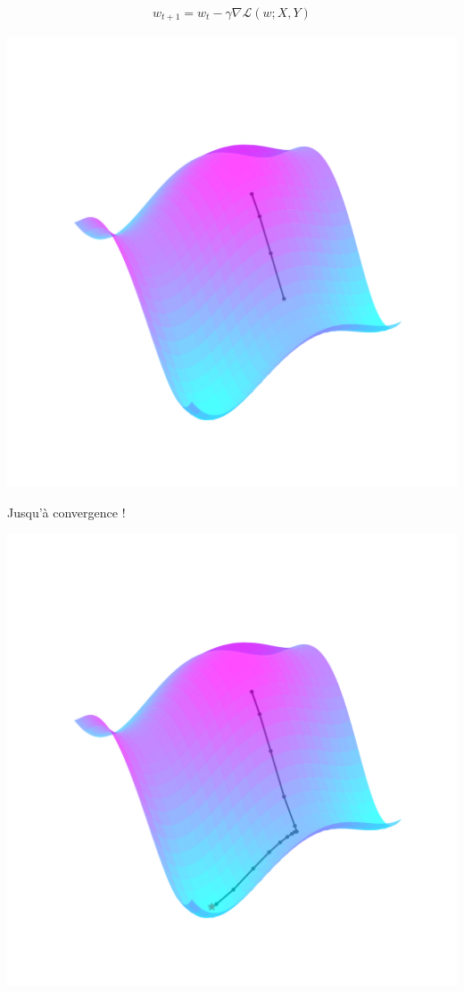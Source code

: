 \documentclass[notheorems]{beamer}
\begin{document}
\addtocounter{framenumber}{-1}
\begin{frame}
  \begin{align}
    w_{t+1} = w_t - \gamma \nabla \mathcal L(w; X, Y) \nonumber
  \end{align}

  \vspace{-4em}

  \centering

  \includegraphics[width=0.8\linewidth]{images/gd_4.pdf}
\end{frame}
\addtocounter{framenumber}{-1}
\begin{frame}
  \centering
  \vspace{1.7em}
  Jusqu'à convergence !

  \vspace{-3.37em}

  \includegraphics[width=0.8\linewidth]{images/gd_all.pdf}
\end{frame}
\addtocounter{framenumber}{-1}
\end{document}
